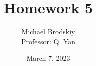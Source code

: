 


\usepackage[dvipsnames,table]{xcolor}
\usepackage{siunitx} %
\usepackage{pgfplots}

\title{Homework 5}
\date{March 7, 2023}
\author{Michael Brodskiy\\ \small Professor: Q. Yan}



\maketitle

\newpage

